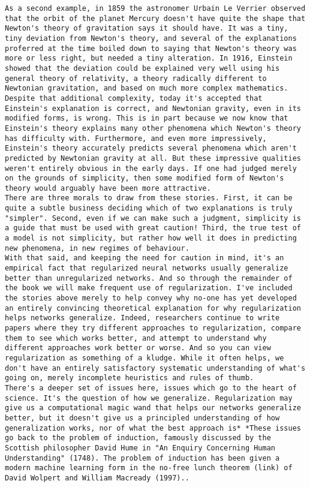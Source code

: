\begin{lstlisting}
As a second example, in 1859 the astronomer Urbain Le Verrier observed that the orbit of the planet Mercury doesn't have quite the shape that Newton's theory of gravitation says it should have. It was a tiny, tiny deviation from Newton's theory, and several of the explanations proferred at the time boiled down to saying that Newton's theory was more or less right, but needed a tiny alteration. In 1916, Einstein showed that the deviation could be explained very well using his general theory of relativity, a theory radically different to Newtonian gravitation, and based on much more complex mathematics. Despite that additional complexity, today it's accepted that Einstein's explanation is correct, and Newtonian gravity, even in its modified forms, is wrong. This is in part because we now know that Einstein's theory explains many other phenomena which Newton's theory has difficulty with. Furthermore, and even more impressively, Einstein's theory accurately predicts several phenomena which aren't predicted by Newtonian gravity at all. But these impressive qualities weren't entirely obvious in the early days. If one had judged merely on the grounds of simplicity, then some modified form of Newton's theory would arguably have been more attractive.
There are three morals to draw from these stories. First, it can be quite a subtle business deciding which of two explanations is truly "simpler". Second, even if we can make such a judgment, simplicity is a guide that must be used with great caution! Third, the true test of a model is not simplicity, but rather how well it does in predicting new phenomena, in new regimes of behaviour.
With that said, and keeping the need for caution in mind, it's an empirical fact that regularized neural networks usually generalize better than unregularized networks. And so through the remainder of the book we will make frequent use of regularization. I've included the stories above merely to help convey why no-one has yet developed an entirely convincing theoretical explanation for why regularization helps networks generalize. Indeed, researchers continue to write papers where they try different approaches to regularization, compare them to see which works better, and attempt to understand why different approaches work better or worse. And so you can view regularization as something of a kludge. While it often helps, we don't have an entirely satisfactory systematic understanding of what's going on, merely incomplete heuristics and rules of thumb.
There's a deeper set of issues here, issues which go to the heart of science. It's the question of how we generalize. Regularization may give us a computational magic wand that helps our networks generalize better, but it doesn't give us a principled understanding of how generalization works, nor of what the best approach is* *These issues go back to the problem of induction, famously discussed by the Scottish philosopher David Hume in "An Enquiry Concerning Human Understanding" (1748). The problem of induction has been given a modern machine learning form in the no-free lunch theorem (link) of David Wolpert and William Macready (1997)..

\end{lstlisting}
